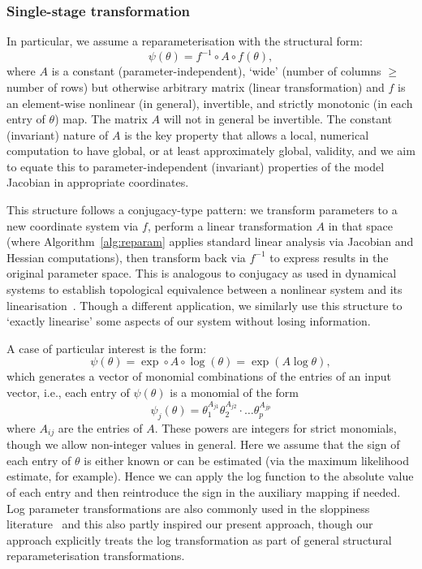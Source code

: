 \subsubsection{Single-stage transformation}
In particular, we assume a reparameterisation with the structural form:
\begin{equation}
\psi(\theta) = f^{-1} \circ A \circ f(\theta),
\end{equation}
where $A$ is a constant (parameter-independent), `wide' (number of columns $\geq$ number of rows) but otherwise arbitrary matrix (linear transformation) and $f$ is an element-wise nonlinear (in general), invertible, and strictly monotonic (in each entry of $\theta$) map. The matrix $A$ will not in general be invertible. The constant (invariant) nature of $A$ is the key property that allows a local, numerical computation to have global, or at least approximately global, validity, and we aim to equate this to parameter-independent (invariant) properties of the model Jacobian in appropriate coordinates.

This structure follows a conjugacy-type pattern: we transform parameters to a new coordinate system via $f$, perform a linear transformation $A$ in that space (where Algorithm~\ref{alg:reparam} applies standard linear analysis via Jacobian and Hessian computations), then transform back via $f^{-1}$ to express results in the original parameter space. This is analogous to conjugacy as used in dynamical systems to establish topological equivalence between a nonlinear system and its linearisation~\cite{Wiggins2003}. Though a different application, we similarly use this structure to `exactly linearise' some aspects of our system without losing information.

A case of particular interest is the form:
\begin{equation}
\psi(\theta) = \exp \circ A \circ \log (\theta) = \exp(A \log \theta),
\end{equation}
which generates a vector of monomial combinations of the entries of an input vector, i.e., each entry of $\psi(\theta)$ is a monomial of the form
\begin{equation}
\psi_j(\theta) = \theta_1^{A_{j1}}\theta_2^{A_{j2}}\cdot\dots\theta_p^{A_{jp}}
\end{equation}
where $A_{ij}$ are the entries of $A$. These powers are integers for strict monomials, though we allow non-integer values in general. Here we assume that the sign of each entry of $\theta$ is either known or can be estimated (via the maximum likelihood estimate, for example). Hence we can apply the log function to the absolute value of each entry and then reintroduce the sign in the auxiliary mapping if needed. Log parameter transformations are also commonly used in the sloppiness literature~\cite{Brown2004,Monsalve2022,Vollert2023} and this also partly inspired our present approach, though our approach explicitly treats the log transformation as part of general structural reparameterisation transformations.

